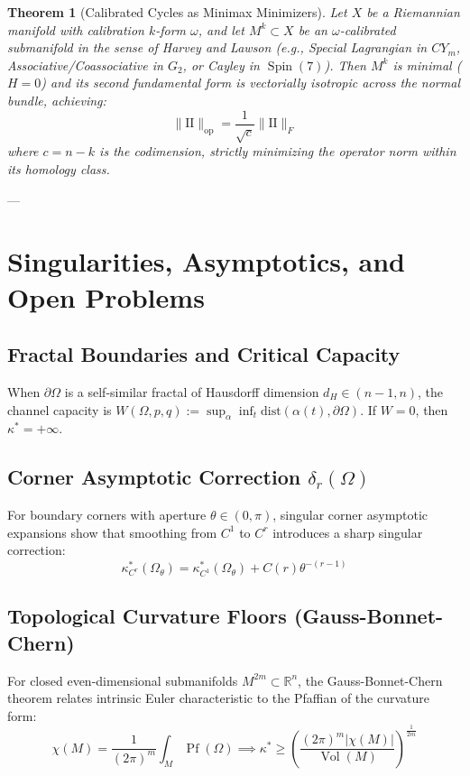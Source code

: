 \documentclass[11pt,reqno]{amsart}
\newtheorem{theorem}{Theorem}[section]
\theoremstyle{definition}
\providecommand{\R}{\mathbb{R}}
\providecommand{\II}{\mathrm{I\!I}}
\newcommand{\op}{\mathrm{op}}
\newcommand{\dist}{\mathrm{dist}}
\numberwithin{equation}{section}
\providecommand{\II}{\mathrm{II}}
\providecommand{\R}{\mathbb{R}}
\begin{document}
\begin{theorem}[Calibrated Cycles as Minimax Minimizers]
\label{thm:calibrated_minimax}
Let $X$ be a Riemannian manifold with calibration $k$-form $\omega$, and let $M^k \subset X$ be an $\omega$-calibrated submanifold in the sense of Harvey and Lawson \cite{harvey1982} (e.g., Special Lagrangian in $CY_m$, Associative/Coassociative in $G_2$, or Cayley in $\operatorname{Spin}(7)$). Then $M^k$ is minimal ($H = 0$) and its second fundamental form is vectorially isotropic across the normal bundle, achieving:
\begin{equation}
\|\II\|_{\op} = \frac{1}{\sqrt{c}} \|\II\|_{F}
\end{equation}
where $c = n-k$ is the codimension, strictly minimizing the operator norm within its homology class.
\end{theorem}

---

\section{Singularities, Asymptotics, and Open Problems}

\subsection{Fractal Boundaries and Critical Capacity}
When $\partial\Omega$ is a self-similar fractal of Hausdorff dimension $d_H \in (n-1, n)$, the channel capacity is $W(\Omega, p, q) := \sup_{\alpha} \inf_{t} \dist(\alpha(t), \partial\Omega)$. If $W = 0$, then $\kappa^* = +\infty$.

\subsection{Corner Asymptotic Correction \texorpdfstring{$\delta_r(\Omega)$}{delta\_r(Omega)}}
For boundary corners with aperture $\theta \in (0, \pi)$, singular corner asymptotic expansions \cite{grisvard1985} show that smoothing from $C^1$ to $C^r$ introduces a sharp singular correction:
\begin{equation}
\kappa^*_{C^r}(\Omega_\theta) = \kappa^*_{C^1}(\Omega_\theta) + C(r) \theta^{-(r-1)}
\end{equation}

\subsection{Topological Curvature Floors (Gauss-Bonnet-Chern)}
For closed even-dimensional submanifolds $M^{2m} \subset \R^n$, the Gauss-Bonnet-Chern theorem relates intrinsic Euler characteristic to the Pfaffian of the curvature form:
\begin{equation}
\chi(M) = \frac{1}{(2\pi)^m} \int_M \operatorname{Pf}(\Omega) \implies \kappa^* \geq \left( \frac{(2\pi)^m |\chi(M)|}{\operatorname{Vol}(M)} \right)^{\frac{1}{2m}}
\end{equation}
\end{document}
